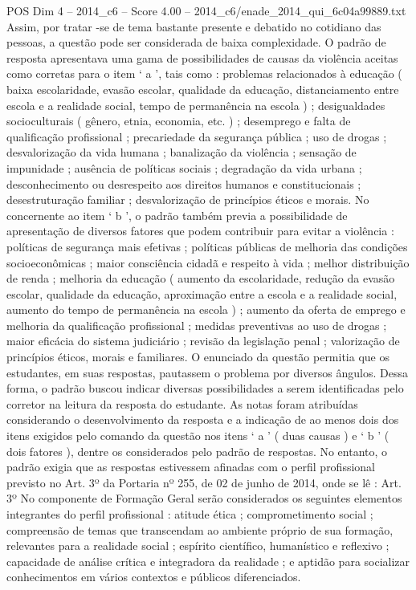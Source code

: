 \begin{textsample}{POS Dim 4 – 2014\_c6 – Score 4.00 – 2014\_c6/enade\_2014\_qui\_6c04a99889.txt}
Assim, por tratar -se de tema bastante presente e debatido no cotidiano das pessoas, a questão pode ser considerada de baixa complexidade.
O padrão de resposta apresentava uma gama de possibilidades de causas da violência aceitas como corretas para o item ‘ a ’, tais como : problemas relacionados à educação ( baixa escolaridade, evasão escolar, qualidade da educação, distanciamento entre escola e a realidade social, tempo de permanência na escola ) ; desigualdades socioculturais ( gênero, etnia, economia, etc. ) ; desemprego e falta de qualificação profissional ; precariedade da segurança pública ; uso de drogas ; desvalorização da vida humana ; banalização da violência ; sensação de impunidade ; ausência de políticas sociais ; degradação da vida urbana ; desconhecimento ou desrespeito aos direitos humanos e constitucionais ; desestruturação familiar ; desvalorização de princípios éticos e morais.
No concernente ao item ‘ b ’, o padrão também previa a possibilidade de apresentação de diversos fatores que podem contribuir para evitar a violência : políticas de segurança mais efetivas ; políticas públicas de melhoria das condições socioeconômicas ; maior consciência cidadã e respeito à vida ; melhor distribuição de renda ; melhoria da educação ( aumento da escolaridade, redução da evasão escolar, qualidade da educação, aproximação entre a escola e a realidade social, aumento do tempo de permanência na escola ) ; aumento da oferta de emprego e melhoria da qualificação profissional ; medidas preventivas ao uso de drogas ; maior eficácia do sistema judiciário ; revisão da legislação penal ; valorização de princípios éticos, morais e familiares.
O enunciado da questão permitia que os estudantes, em suas respostas, pautassem o problema por diversos ângulos.
Dessa forma, o padrão buscou indicar diversas possibilidades a serem identificadas pelo corretor na leitura da resposta do estudante.
As notas foram atribuídas considerando o desenvolvimento da resposta e a indicação de ao menos dois dos itens exigidos pelo comando da questão nos itens ‘ a ’ ( duas causas ) e ‘ b ’ ( dois fatores ), dentre os considerados pelo padrão de respostas.
No entanto, o padrão exigia que as respostas estivessem afinadas com o perfil profissional previsto no Art. 3º da Portaria nº 255, de 02 de junho de 2014, onde se lê : Art. 3º No componente de Formação Geral serão considerados os seguintes elementos integrantes do perfil profissional : atitude ética ; comprometimento social ; compreensão de temas que transcendam ao ambiente próprio de sua formação, relevantes para a realidade social ; espírito científico, humanístico e reflexivo ; capacidade de análise crítica e integradora da realidade ; e aptidão para socializar conhecimentos em vários contextos e públicos diferenciados.

\end{textsample}
